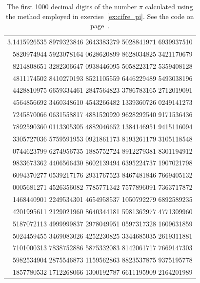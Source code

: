 \begin{table}
\begin{center}
\begin{tabular}{r}
\ttfamily\footnotesize 3.1415926535 8979323846 2643383279 5028841971 6939937510 \\
\ttfamily\footnotesize   5820974944 5923078164 0628620899 8628034825 3421170679 \\
\ttfamily\footnotesize   8214808651 3282306647 0938446095 5058223172 5359408128 \\
\ttfamily\footnotesize   4811174502 8410270193 8521105559 6446229489 5493038196 \\
\ttfamily\footnotesize   4428810975 6659334461 2847564823 3786783165 2712019091 \\
\ttfamily\footnotesize   4564856692 3460348610 4543266482 1339360726 0249141273 \\
\ttfamily\footnotesize   7245870066 0631558817 4881520920 9628292540 9171536436 \\
\ttfamily\footnotesize   7892590360 0113305305 4882046652 1384146951 9415116094 \\
\ttfamily\footnotesize   3305727036 5759591953 0921861173 8193261179 3105118548 \\
\ttfamily\footnotesize   0744623799 6274956735 1885752724 8912279381 8301194912 \\
\ttfamily\footnotesize   9833673362 4406566430 8602139494 6395224737 1907021798 \\
\ttfamily\footnotesize   6094370277 0539217176 2931767523 8467481846 7669405132 \\
\ttfamily\footnotesize   0005681271 4526356082 7785771342 7577896091 7363717872 \\
\ttfamily\footnotesize   1468440901 2249534301 4654958537 1050792279 6892589235 \\
\ttfamily\footnotesize   4201995611 2129021960 8640344181 5981362977 4771309960 \\
\ttfamily\footnotesize   5187072113 4999999837 2978049951 0597317328 1609631859 \\
\ttfamily\footnotesize   5024459455 3469083026 4252230825 3344685035 2619311881 \\
\ttfamily\footnotesize   7101000313 7838752886 5875332083 8142061717 7669147303 \\
\ttfamily\footnotesize   5982534904 2875546873 1159562863 8823537875 9375195778 \\
\ttfamily\footnotesize   1857780532 1712268066 1300192787 6611195909 2164201989
\end{tabular}
\end{center}
\caption{The first 1000 decimal digits of the number $\pi$ calculated using the method employed in exercise~\ref{ex:cifre_pi}. See the code on page~\pageref{code:compute_pi}.}
\label{tab:cifre_pi}
\end{table}

